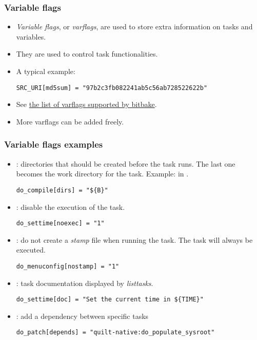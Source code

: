 \begin{frame}[fragile]
  \frametitle{Variable flags}
  \begin{itemize}
    \item {\em Variable flags}, or {\em varflags}, are used to store extra
      information on tasks and variables.
    \item They are used to control task functionalities.
    \item A typical example:
  \begin{verbatim}
SRC_URI[md5sum] = "97b2c3fb082241ab5c56ab728522622b"
  \end{verbatim}
  \item See
    \href{https://docs.yoctoproject.org/bitbake/bitbake-user-manual/bitbake-user-manual-metadata.html#variable-flags}{the list of varflags supported by bitbake}.
  \item More varflags can be added freely.
  \end{itemize}
\end{frame}

\begin{frame}[fragile]
  \frametitle{Variable flags examples}
  \begin{itemize}
    \item {}: directories that should be created before the task
      runs. The last one becomes the work directory for the task.
      Example:  in .
      \begin{verbatim}
do_compile[dirs] = "${B}"
      \end{verbatim}
    \item {}: disable the execution of the task.
      \begin{verbatim}
do_settime[noexec] = "1"
      \end{verbatim}
    \item {}: do not create a {\em stamp} file when running the
      task. The task will always be executed.
      \begin{verbatim}
do_menuconfig[nostamp] = "1"
      \end{verbatim}
    \item {}: task documentation displayed by {\em listtasks}.
      \begin{verbatim}
do_settime[doc] = "Set the current time in ${TIME}"
      \end{verbatim}
    \item {}: add a dependency between specific tasks
      \begin{verbatim}
do_patch[depends] = "quilt-native:do_populate_sysroot"
      \end{verbatim}
  \end{itemize}
\end{frame}

